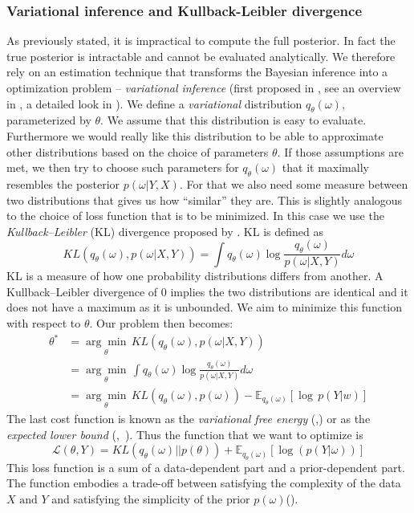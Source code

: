 \documentclass[12pt,a4paper,twoside]{scrartcl}
\numberwithin{equation}{section}
\begin{document}
\subsubsection{Variational inference and Kullback-Leibler divergence}\label{sec:var-inference}
As previously stated, it is impractical to compute the full posterior. In fact the true posterior is intractable and cannot be evaluated analytically. We therefore rely on an estimation technique that transforms the Bayesian inference into a optimization problem -- \emph{variational inference} (first proposed in \cite{jordan1999}, see an overview in \cite{blei2016}, a detailed look in \cite{fox2012}). We define a \emph{variational} distribution \(q_{\theta}(\omega)\), parameterized by \(\theta \). We assume that this distribution is easy to evaluate. Furthermore we would really like this distribution to be able to approximate other distributions based on the choice of parameters \(\theta\). If those assumptions are met, we then try to choose such parameters for \(q_{\theta}(\omega)\) that it maximally resembles the posterior \(p(\omega|Y,X)\). For that we also need some measure between two distributions that gives us how ``similar'' they are. This is slightly analogous to the choice of loss function that is to be minimized. In this case we use the \emph{Kullback–Leibler} (KL) divergence proposed by \cite{kullback1951}. KL is defined as
\begin{equation}
  KL(q_{\theta}(\omega), p(\omega | X, Y)) = \int q_{\theta}(\omega) \log \frac{q_{\theta}(\omega)}{p(\omega | X, Y)}d\omega 
\end{equation}
KL is a measure of how one probability distributions differs from another. A Kullback–Leibler divergence of \(0\) implies the two distributions are identical and it does not have a maximum as it is unbounded. We aim to minimize this function with respect to \(\theta\). Our problem then becomes:
\begin{align}
  \theta^* &= \underset{\theta}{\arg\min} \,  KL(q_{\theta}(\omega), p(\omega | X, Y))\\
           &= \underset{\theta}{\arg\min}\, \int q_{\theta}(\omega) \log \frac{q_{\theta}(\omega)}{p(\omega | X, Y)}d\omega \\
           & = \underset{\theta}{\arg\min}\,  KL(q_{\theta}(\omega), p(\omega)) - \mathbb{E}_{q_{\theta}(\omega)}[\log\, p(Y|w)]
\end{align}
The last cost function is known as the \emph{variational free energy} (\cite{neal1998},\cite{blundell2015}) or as the \emph{expected lower bound} (\cite{fox2012},~\cite{saul1996}). Thus the function that we want to optimize is
\begin{equation}
  \mathcal{L}(\theta, Y) = KL(q_{\theta}(\omega)||p(\theta)) + \mathbb{E}_{q_{\theta}(\omega)}[\log(p(Y|\omega))]
\end{equation}
This loss function is a sum of a data-dependent part and a prior-dependent part. The function embodies a trade-off between satisfying the complexity of the data \(X \text{ and } Y \) and satisfying the simplicity of the prior \(p(\omega)\)(\cite{blundell2015}).
\end{document}
